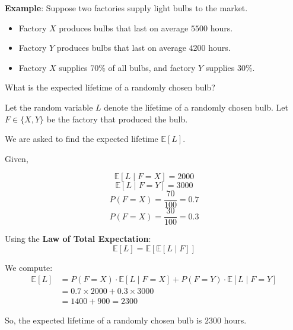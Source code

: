 \documentclass[twoside]{book}
\begin{document}
\textbf{Example}: Suppose two factories supply light bulbs to the market.

\begin{itemize}
    \item Factory \( X \) produces bulbs that last on average \( 5500 \) hours.
    \item Factory \( Y \) produces bulbs that last on average \( 4200 \) hours.
    \item Factory \( X \) supplies 70\% of all bulbs, and factory \( Y \) supplies 30\%.
\end{itemize}

What is the expected lifetime of a randomly chosen bulb?

Let the random variable \( L \) denote the lifetime of a randomly chosen bulb. Let \( F \in \{X, Y\} \) be the factory that produced the bulb. 

We are asked to find the expected lifetime \( \mathbb{E}[L] \).

Given,

$$\mathbb{E}[L \mid F = X] = 2000$$
$$\mathbb{E}[L \mid F = Y] = 3000$$
$$P(F=X) = \dfrac{70}{100} = 0.7$$
$$P(F=X) = \dfrac{30}{100} = 0.3$$

Using the \textbf{Law of Total Expectation}:
\[
\mathbb{E}[L] = \mathbb{E}[\mathbb{E}[L \mid F]]
\]

We compute:
\begin{align*}
\mathbb{E}[L] 
&= P(F = X) \cdot \mathbb{E}[L \mid F = X] + P(F = Y) \cdot \mathbb{E}[L \mid F = Y] \\
&= 0.7 \times 2000 + 0.3 \times 3000 \\
&= 1400 + 900 = 2300
\end{align*}

So, the expected lifetime of a randomly chosen bulb is $2300$ hours.






\end{document}
